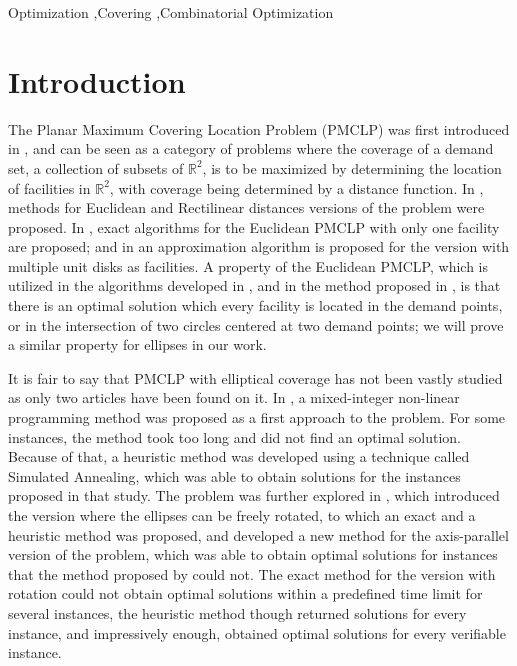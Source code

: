\documentclass[a4]{elsarticle}
\newcommand{\R}{\mathbb{R}}
\begin{document}
\begin{frontmatter}
		\begin{keyword}
			Optimization \sep Covering \sep Combinatorial Optimization
			
			
		\end{keyword}
		
	\end{frontmatter}
	
	
	\section{Introduction}
	
	The Planar Maximum Covering Location Problem (PMCLP) was first introduced in \cite{church:1984}, and can be seen as a category of problems where the coverage of a demand set, a collection of subsets of $\R^2$, is to be maximized by determining the location of facilities in $\R^2$, with coverage being determined by a distance function.
	In \cite{church:1984}, methods for Euclidean and Rectilinear distances versions of the problem were proposed.
	In \cite{drezner, chazelle:1986}, exact algorithms for the Euclidean PMCLP with only one facility are proposed; and in \cite{cabello:2006} an approximation algorithm is proposed for the version with multiple unit disks as facilities.
	A property of the Euclidean PMCLP, which is utilized in the algorithms developed in \cite{drezner, chazelle:1986, cabello:2006}, and in the method proposed in \cite{church:1984}, is that there is an optimal solution which every facility is located in the demand points, or in the intersection of two circles centered at two demand points; we will prove a similar property for ellipses in our work.
	
	It is fair to say that PMCLP with elliptical coverage has not been vastly studied as only two articles have been found on it. In \cite{canbolat}, a mixed-integer non-linear programming method was proposed as a first approach to the problem. For some instances, the method took too long and did not find an optimal solution. Because of that, a heuristic method was developed using a technique called Simulated Annealing, which was able to obtain solutions for the instances proposed in that study.
	The problem was further explored in \cite{andreta}, which introduced the version where the ellipses can be freely rotated, to which an exact and a heuristic method was proposed, and developed a new method for the axis-parallel version of the problem, which was able to obtain optimal solutions for instances that the method proposed by \cite{canbolat} could not.
	The exact method for the version with rotation could not obtain optimal solutions within a predefined time limit for several instances, the heuristic method though returned solutions for every instance, and impressively enough, obtained optimal solutions for every verifiable instance.
	
\end{document}
